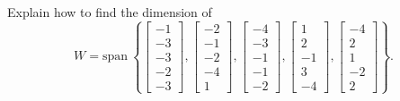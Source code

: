 \documentclass{article}
\begin{document}
\begin{exerciseStatement}
    Explain how to find the dimension of
\[W=\mathrm{span}\ \left\{\left[\begin{array}{r}
-1 \\
-3 \\
-3 \\
-2 \\
-3
\end{array}\right] , \left[\begin{array}{r}
-2 \\
-1 \\
-2 \\
-4 \\
1
\end{array}\right] , \left[\begin{array}{r}
-4 \\
-3 \\
-1 \\
-1 \\
-2
\end{array}\right] , \left[\begin{array}{r}
1 \\
2 \\
-1 \\
3 \\
-4
\end{array}\right] , \left[\begin{array}{r}
-4 \\
2 \\
1 \\
-2 \\
2
\end{array}\right]\right\}.\]



  
\end{exerciseStatement}
\end{document}
